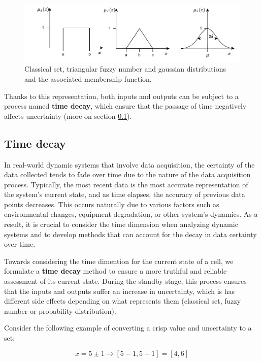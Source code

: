 \begin{figure}[h!]
    \centering
    \includegraphics[width=15cm]{figures/chapter4/cell/classic_fuzzy_gaussian.pdf}
    \caption{Classical set, triangular fuzzy number and gaussian distributions and the associated membership function.}
    \label{fig:classicfuzzygaussian}
\end{figure}

Thanks to this representation, both inputs and outputs can be subject to a process named \textbf{time decay}, which ensure that the passage of time negatively affects uncertainty (more on section \ref{subsec:timedecay}).


\subsection{Time decay} \label{subsec:timedecay}

In real-world dynamic systems that involve data acquisition, the certainty of the data collected tends to fade over time due to the nature of the data acquisition process. Typically, the most recent data is the most accurate representation of the system's current state, and as time elapses, the accuracy of previous data points decreases. This occurs naturally due to various factors such as environmental changes, equipment degradation, or other system's dynamics. As a result, it is crucial to consider the time dimension when analyzing dynamic systems and to develop methods that can account for the decay in data certainty over time.

Towards considering the time dimention for the current state of a cell, we formulate a \textbf{time decay} method to ensure a more truthful and reliable assessment of its current state. During the standby stage, this process ensures that the inputs and outputs suffer an increase in uncertainty, which is has different side effects depending on what represents them (classical set, fuzzy number or probability distribution).

Consider the following example of converting a crisp value and uncertainty to a set:

$$x = 5 \pm 1 \rightarrow [5-1, 5+1] = [4, 6]$$

